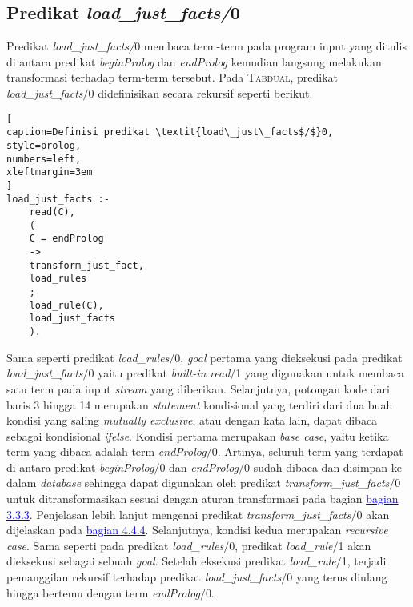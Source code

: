 \subsection{Predikat \textit{load\_just\_facts/}0}

Predikat \textit{load\_just\_facts/}0 membaca term-term pada program input yang ditulis di antara predikat \textit{beginProlog} dan \textit{endProlog} kemudian langsung melakukan transformasi terhadap term-term tersebut. Pada \textsc{Tabdual}, predikat \textit{load\_just\_facts$/$}0 didefinisikan secara rekursif seperti berikut.
\\

\begin{lstlisting}[
caption=Definisi predikat \textit{load\_just\_facts$/$}0,
style=prolog,
numbers=left,
xleftmargin=3em
]
load_just_facts :-
	read(C),
	(
	C = endProlog
	->
	transform_just_fact,
	load_rules
	;
	load_rule(C),
	load_just_facts
	).
\end{lstlisting}

Sama seperti predikat \textit{load\_rules$/$}0, \textit{goal} pertama yang dieksekusi pada predikat \textit{load\_just\_facts$/$}0  yaitu predikat \textit{built-in} \textit{read$/$}1 yang digunakan untuk membaca satu term pada input \textit{stream} yang diberikan. Selanjutnya, potongan kode dari baris 3 hingga 14 merupakan \textit{statement} kondisional yang terdiri dari dua buah kondisi yang saling \textit{mutually exclusive}, atau dengan kata lain, dapat dibaca sebagai kondisional \textit{if\textendash else}. Kondisi pertama merupakan \textit{base case}, yaitu ketika term yang dibaca adalah term \textit{endProlog$/$}0. Artinya, seluruh term yang terdapat di antara predikat \textit{beginProlog$/$}0 dan \textit{endProlog$/$}0 sudah dibaca dan disimpan ke dalam \textit{database} sehingga dapat digunakan oleh predikat \textit{transform\_just\_facts$/$}0 \label{justfacts2} untuk ditransformasikan sesuai dengan aturan transformasi pada bagian \hyperref[transfact]{\textcolor{blue}{bagian 3.3.3}}. Penjelasan lebih lanjut mengenai predikat \textit{transform\_just\_facts$/$}0 akan dijelaskan pada \hyperref[justfacts]{\textcolor{blue}{bagian 4.4.4}}. Selanjutnya, kondisi kedua merupakan \textit{recursive case}. Sama seperti pada predikat \textit{load\_rules$/$}0, predikat \textit{load\_rule$/$}1 akan dieksekusi sebagai sebuah \textit{goal}. Setelah eksekusi predikat \textit{load\_rule$/$}1, terjadi pemanggilan rekursif terhadap predikat \textit{load\_just\_facts$/$}0 yang terus diulang hingga bertemu dengan term \textit{endProlog$/$}0.

